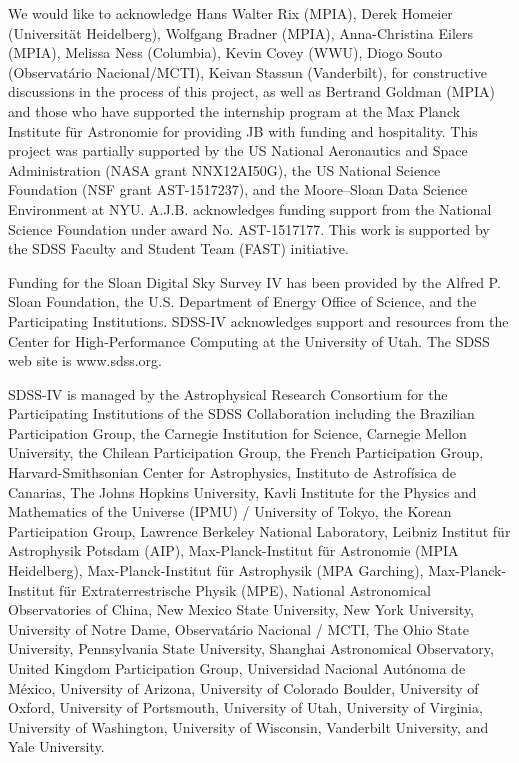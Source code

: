 \documentclass[twocolumn]{aastex62}
\begin{document}
\acknowledgements
We would like to acknowledge Hans Walter Rix (MPIA), Derek Homeier (Universit{\"a}t Heidelberg), Wolfgang Bradner (MPIA), Anna-Christina Eilers (MPIA), Melissa Ness (Columbia), Kevin Covey (WWU), Diogo Souto (Observatário Nacional/MCTI), Keivan Stassun (Vanderbilt), \color{red}{\bf Katia Cunha (NOAO), Anthony Brown (Leiden), Aida Behmard (Caltech) and Christopher Theissen (UCSD) }\color{black} for constructive discussions in the process of this project, as well as Bertrand Goldman (MPIA) and those who have supported the internship program at the Max Planck Institute f{\"u}r Astronomie for providing JB with funding and hospitality.
This project was partially supported by
the US National Aeronautics and Space Administration (NASA grant NNX12AI50G),
the US National Science Foundation (NSF grant AST-1517237),
and the Moore--Sloan Data Science Environment at NYU.
A.J.B. acknowledges funding support from the National Science Foundation under award No. AST-1517177.
This work is supported by the SDSS Faculty and Student Team (FAST) initiative.

Funding for the Sloan Digital Sky Survey IV has been provided by the Alfred P. Sloan Foundation, the U.S. Department of Energy Office of Science, and the Participating Institutions. SDSS-IV acknowledges support and resources from the Center for High-Performance Computing at
the University of Utah. The SDSS web site is www.sdss.org.

SDSS-IV is managed by the Astrophysical Research Consortium for the 
Participating Institutions of the SDSS Collaboration including the 
Brazilian Participation Group, the Carnegie Institution for Science, 
Carnegie Mellon University, the Chilean Participation Group, the French Participation Group, Harvard-Smithsonian Center for Astrophysics, 
Instituto de Astrof\'isica de Canarias, The Johns Hopkins University, 
Kavli Institute for the Physics and Mathematics of the Universe (IPMU) / 
University of Tokyo, the Korean Participation Group, Lawrence Berkeley National Laboratory, 
Leibniz Institut f\"ur Astrophysik Potsdam (AIP),  
Max-Planck-Institut f\"ur Astronomie (MPIA Heidelberg), 
Max-Planck-Institut f\"ur Astrophysik (MPA Garching), 
Max-Planck-Institut f\"ur Extraterrestrische Physik (MPE), 
National Astronomical Observatories of China, New Mexico State University, 
New York University, University of Notre Dame, 
Observat\'ario Nacional / MCTI, The Ohio State University, 
Pennsylvania State University, Shanghai Astronomical Observatory, 
United Kingdom Participation Group,
Universidad Nacional Aut\'onoma de M\'exico, University of Arizona, 
University of Colorado Boulder, University of Oxford, University of Portsmouth, 
University of Utah, University of Virginia, University of Washington, University of Wisconsin, 
Vanderbilt University, and Yale University.
\end{document}
